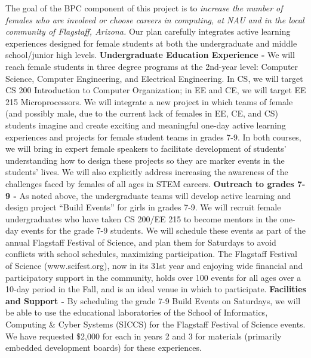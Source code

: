 The goal of the BPC component of this project is to \textit{increase the number of females who are involved or choose careers in computing, at NAU and in the local community of Flagstaff, Arizona.}  Our plan carefully integrates active learning experiences designed for female students at both the undergraduate and middle school/junior high levels. \textbf{Undergraduate Education Experience -} We will reach female students in three degree programs at the 2nd-year level: Computer Science, Computer Engineering, and Electrical Engineering. In CS, we will target CS 200 Introduction to Computer Organization; in EE and CE, we will target EE 215 Microprocessors. We will integrate a new project in which teams of female (and possibly male, due to the current lack of females in EE, CE, and CS) students imagine and create exciting and meaningful one-day active learning experiences and projects for female student teams in grades 7-9.  In both courses, we will bring in expert female speakers to facilitate development of students’ understanding how to design these projects so they are marker events in the students’ lives. We will also explicitly address increasing the awareness of the challenges faced by females of all ages in STEM careers. \textbf{Outreach to grades 7-9 -} As noted above, the undergraduate teams will develop active learning and design project “Build Events” for girls in grades 7-9. We will recruit female undergraduates who have taken CS 200/EE 215 to become mentors in the one-day events for the grade 7-9 students.  We will schedule these events as part of the annual Flagstaff Festival of Science, and plan them for Saturdays to avoid conflicts with school schedules, maximizing participation. The Flagstaff Festival of Science (www.scifest.org), now in its 31st year and enjoying wide financial and participatory support in the community, holds over 100 events for all ages over a 10-day period in the Fall, and is an ideal venue in which to participate. \textbf{Facilities and Support -} By scheduling the grade 7-9 Build Events on Saturdays, we will be able to use the educational laboratories of the School of Informatics, Computing \& Cyber Systems (SICCS) for the Flagstaff Festival of Science events. We have requested \$2,000 for each in years 2 and 3 for materials (primarily embedded development boards) for these experiences.